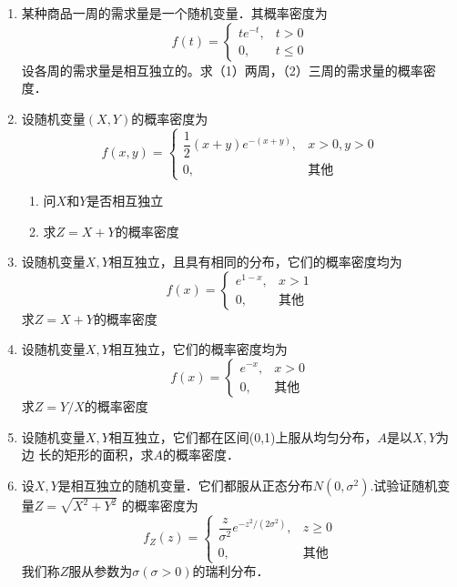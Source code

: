 \begin{enumerate}
     
    \item 某种商品一周的需求量是一个随机变量．其概率密度为
    $$f(t)=\left\{\begin{array}{ll}
        te^{-t}, & t>0\\
        0, & t\leq 0 
    \end{array}\right.$$
    设各周的需求量是相互独立的。求（1）两周，（2）三周的需求量的概率密度．


    \item 设随机变量$(X,Y)$的概率密度为
    $$f(x,y)=\left\{\begin{array}{ll}
        \dfrac{1}{2}(x+y)e^{-(x+y)}, & x>0,y>0\\
        0, & \mbox{其他}
    \end{array}\right.$$
    \begin{enumerate}
        \item 问$X$和$Y$是否相互独立
        \item 求$Z=X+Y$的概率密度
    \end{enumerate}


    \item 设随机变量$X,Y$相互独立，且具有相同的分布，它们的概率密度均为
    $$f(x)=\left\{\begin{array}{ll}
        e^{1-x}, & x>1\\
        0, & \mbox{其他}
    \end{array}\right.$$
    求$Z=X+Y$的概率密度


    \item 设随机变量$X,Y$相互独立，它们的概率密度均为
    $$f(x)=\left\{\begin{array}{ll}
        e^{-x}, & x>0\\
        0, & \mbox{其他}
    \end{array}\right.$$
    求$Z=Y/X$的概率密度


    \item 设随机变量$X,Y$相互独立，它们都在区间(0,1)上服从均匀分布，$A$是以$X,Y$为边
    长的矩形的面积，求$A$的概率密度．


    \item 设$X,Y$是相互独立的随机变量．它们都服从正态分布$N(0,\sigma^2)$.试验证随机变量$Z=\sqrt{X^2+Y^2}$
    的概率密度为
    $$f_Z(z)=\left\{\begin{array}{ll}
        \dfrac{z}{\sigma^2}e^{-z^2/(2\sigma^2)}, & z\geq 0\\
        0, & \mbox{其他}
    \end{array}\right.$$
    我们称$Z$服从参数为$\sigma(\sigma>0)$的瑞利分布．




\end{enumerate}
